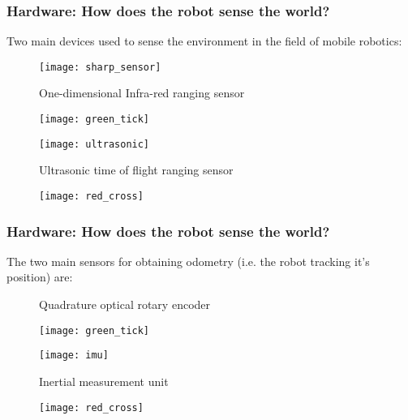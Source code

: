 \documentclass[aspectratio=169]{beamer}
\begin{document}
\begin{frame}
\frametitle{Hardware: How does the robot sense the world?}
Two main devices used to sense the environment in the field of mobile robotics:\\
\vspace{0.25cm}
\begin{minipage}[t]{0.45\textwidth}
\begin{figure}
\centering
\texttt{[image: sharp\_sensor]}
\caption{One-dimensional Infra-red ranging sensor}
\end{figure}
\vspace{-1cm}
\begin{figure}
\centering
\texttt{[image: green\_tick]}
\end{figure}
\end{minipage}
\hspace{1cm}
\begin{minipage}[t]{0.45\textwidth}
\begin{figure}
\centering
\texttt{[image: ultrasonic]}
\caption{Ultrasonic time of flight ranging sensor}
\end{figure}
\vspace{-0.6cm}
\begin{figure}
\centering
\texttt{[image: red\_cross]}
\end{figure}
\end{minipage}
\end{frame}


\begin{frame}
\frametitle{Hardware: How does the robot sense the world?}
The two main sensors for obtaining odometry (i.e. the robot tracking it's position) are:\\
\vspace{0.5cm}
\begin{minipage}[t]{0.45\textwidth}
\begin{figure}
\centering
{}
\caption{Quadrature optical rotary encoder}
\end{figure}
\vspace{-0.5cm}
\begin{figure}
\centering
\texttt{[image: green\_tick]}
\end{figure}
\end{minipage}
\hspace{1cm}
\begin{minipage}[t]{0.45\textwidth}
\begin{figure}
\centering
\texttt{[image: imu]}
\caption{Inertial measurement unit}
\end{figure}
\vspace{-0.6cm}
\begin{figure}
\centering
\texttt{[image: red\_cross]}
\end{figure}
\end{minipage}
\end{frame}
\end{document}
